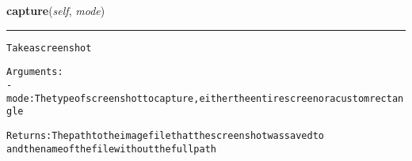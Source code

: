     \label{lib:screenshot:Screenshot:capture}

    \vspace{0.5ex}

\hspace{.8\funcindent}\begin{boxedminipage}{\funcwidth}

    \raggedright \textbf{capture}(\textit{self}, \textit{mode})

    \vspace{-1.5ex}

    \rule{\textwidth}{0.5\fboxrule}
\setlength{\parskip}{2ex}
\begin{alltt}

Take a screenshot

Arguments:
- mode: The type of screenshot to capture, either the entire screen or a custom rectangle

Returns: The path to the image file that the screenshot was saved to
and the name of the file without the full path
\end{alltt}

\setlength{\parskip}{1ex}
    \end{boxedminipage}

